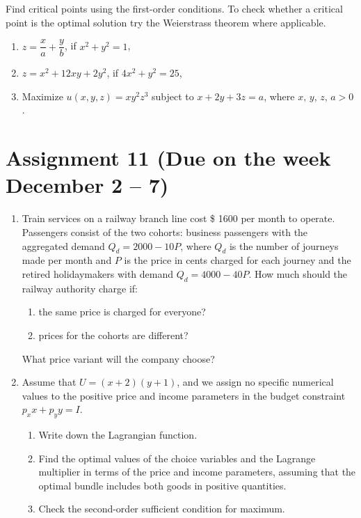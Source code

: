 \documentclass[12pt]{article} %
\theoremstyle{definition} %
\begin{document}
Find critical points using the first-order conditions. To check whether a critical point is the optimal solution try the Weierstrass theorem where applicable.

\begin{enumerate}[resume]
\item $z=\dfrac xa+\dfrac yb$, if $x^2+y^2=1$,
\item $z=x^2+12xy+2y^2$, if $4x^2+y^2=25$,
\item Maximize $u(x,y,z)=xy^2z^3$ subject to $x+2y+3z=a$, where $x,\,y,\,z,\,a>0$.
\end{enumerate}




\section{Assignment 11 (Due on the week December 2 – 7)}

\begin{enumerate}
\item Train	services on a railway branch line cost \$ 1600 per month to operate. Passengers consist of the two cohorts: business passengers with the aggregated demand $Q_d=2000-10P$, where $Q_d$ is the number of journeys made per month and $P$ is the price in cents charged for each journey and the retired holidaymakers with demand $Q_d=4000-40P$. How much should	the railway authority charge if:
    \begin{enumerate}
    \item the same price is charged for everyone?
    \item prices for the cohorts are different?
    \end{enumerate}
What price variant will the company choose?
\item Assume that $U=(x+2)(y+1)$, and we assign no specific numerical values to the positive price and income parameters in the budget constraint $p_xx+p_yy=I$.
    \begin{enumerate}
    \item Write down the Lagrangian function.
    \item Find the optimal values of the choice variables and the Lagrange multiplier in terms of the price and income parameters, assuming that the optimal bundle includes both goods in positive quantities.
    \item Check the second-order sufficient condition for maximum.
    \end{enumerate}
\end{enumerate}
\end{document}
